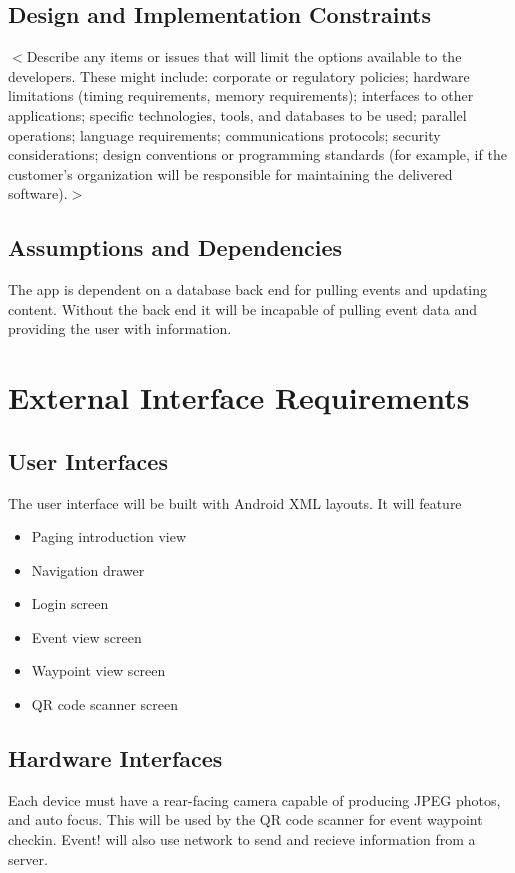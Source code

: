 \documentclass{scrreprt}
\begin{document}
\section{Design and Implementation Constraints}

$<$Describe any items or issues that will limit the options available to the 
developers. These might include: corporate or regulatory policies; hardware 
limitations (timing requirements, memory requirements); interfaces to other 
applications; specific technologies, tools, and databases to be used; parallel 
operations; language requirements; communications protocols; security 
considerations; design conventions or programming standards (for example, if the 
customer’s organization will be responsible for maintaining the delivered 
software).$>$

\section{Assumptions and Dependencies}
The app is dependent on a database back end for pulling events and updating 
content. Without the back end it will be incapable of pulling event data and 
providing the user with information.


\chapter{External Interface Requirements}

\section{User Interfaces}

The user interface will be built with Android XML layouts. It will feature
\begin{itemize}
\item Paging introduction view
\item Navigation drawer
\item Login screen
\item Event view screen
\item Waypoint view screen
\item QR code scanner screen
\end{itemize}

\section{Hardware Interfaces}
Each device must have a rear-facing camera capable of producing JPEG photos, 
and auto focus. This will be used by the QR code scanner for event waypoint checkin.
Event! will also use network to send and recieve information from a server.
\end{document}
